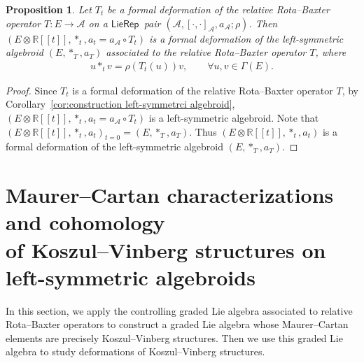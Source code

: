 \documentclass[10pt,a4paper]{amsart}
\numberwithin{equation}{section}
\newtheorem{pro}[thm]{Proposition}
\newcommand{\Real}{\mathbb R}
\newcommand{\huaA}{\mathcal{A}}
\newcommand{\LP}{$\mathsf{LieRep}$~}
\begin{document}
\begin{pro}
 Let $T_t$ be a formal deformation of the relative Rota--Baxter operator $T\colon E\allowbreak\longrightarrow \huaA$ on a \LP pair $(\huaA,[\cdot,\cdot]_\huaA,a_\huaA;\rho)$. Then $(E\otimes \Real[[t]],\ast_t,a_t=a_\huaA\circ T_t)$ is a formal deformation of the left-symmetric algebroid $(E, \ast_{T}, a_T)$ associated to the relative Rota--Baxter operator $T$, where
\begin{gather*}
u\ast_t v=\rho(T_t(u))v,\qquad\forall u,v\in\Gamma(E).
\end{gather*}
\end{pro}
\begin{proof}
Since $T_t$ is a formal deformation of the relative Rota--Baxter operator $T$, by Corollary~\ref{cor:construction left-symmetrci algebroid}, $(E\otimes \Real[[t]],\ast_t,a_t=a_\huaA\circ T_t)$ is a left-symmetric algebroid. Note that $(E\otimes \Real[[t]],\ast_t,a_t)_{t=0}\allowbreak=(E, \ast_{T}, a_T)$. Thus $(E\otimes \Real[[t]],\ast_t,a_t)$ is a formal deformation of the left-symmetric algebroid $(E, \ast_{T}, a_T)$.
\end{proof}

\section[Maurer--Cartan characterizations and cohomology of Koszul--Vinberg structures on left-symmetric algebroids]
{Maurer--Cartan characterizations and cohomology \\of Koszul--Vinberg structures on left-symmetric algebroids}\label{sec:Cohomology-KV-structure}
In this section, we apply the controlling graded Lie algebra associated to relative Rota--Baxter operators to construct a graded Lie algebra whose Maurer--Cartan elements are precisely Koszul--Vinberg structures. Then we use this graded Lie algebra to study deformations of Koszul--Vinberg structures.
\end{document}
